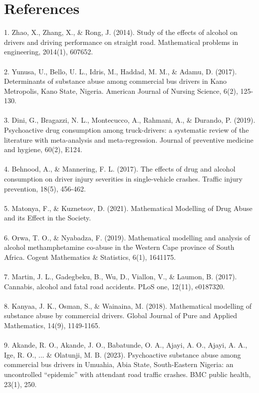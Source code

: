 \documentclass[12pt]{report}
\begin{document}
 \chapter*{References}
 \normalsize
	1.	Zhao, X., Zhang, X., \& Rong, J. (2014). Study of the effects of alcohol on drivers and driving performance on straight road. Mathematical problems in engineering, 2014(1), 607652.\\\\
	2.	Yunusa, U., Bello, U. L., Idris, M., Haddad, M. M., \& Adamu, D. (2017). Determinants of substance abuse among commercial bus drivers in Kano Metropolis, Kano State, Nigeria. American Journal of Nursing Science, 6(2), 125-130.\\\\
 3.   Dini, G., Bragazzi, N. L., Montecucco, A., Rahmani, A., \& Durando, P. (2019). Psychoactive drug consumption among truck-drivers: a systematic review of the literature with meta-analysis and meta-regression. Journal of preventive medicine and hygiene, 60(2), E124.\\\\
	4.  Behnood, A., \& Mannering, F. L. (2017). The effects of drug and alcohol consumption on driver injury severities in single-vehicle crashes. Traffic injury prevention, 18(5), 456-462.\\\\
5.	Matonya, F., \& Kuznetsov, D. (2021). Mathematical Modelling of   Drug Abuse and its Effect in the Society. \\\\
	6.	Orwa, T. O., \& Nyabadza, F. (2019). Mathematical modelling and analysis of alcohol methamphetamine co-abuse in the Western Cape province of South Africa. Cogent Mathematics \& Statistics, 6(1), 1641175. \\\\
7.	Martin, J. L., Gadegbeku, B., Wu, D., Viallon, V., \& Laumon, B. (2017). Cannabis, alcohol and fatal road accidents. PLoS one, 12(11), e0187320.\\\\
	8.	Kanyaa, J. K., Osman, S., \& Wainaina, M. (2018). Mathematical modelling of substance abuse by commercial drivers. Global Journal of Pure and Applied Mathematics, 14(9), 1149-1165.\\\\
9. Akande, R. O., Akande, J. O., Babatunde, O. A., Ajayi, A. O., Ajayi, A. A., Ige, R. O., ... \& Olatunji, M. B. (2023). Psychoactive substance abuse among commercial bus drivers in Umuahia, Abia State, South-Eastern Nigeria: an uncontrolled “epidemic” with attendant road traffic crashes. BMC public health, 23(1), 250.
\end{document}

